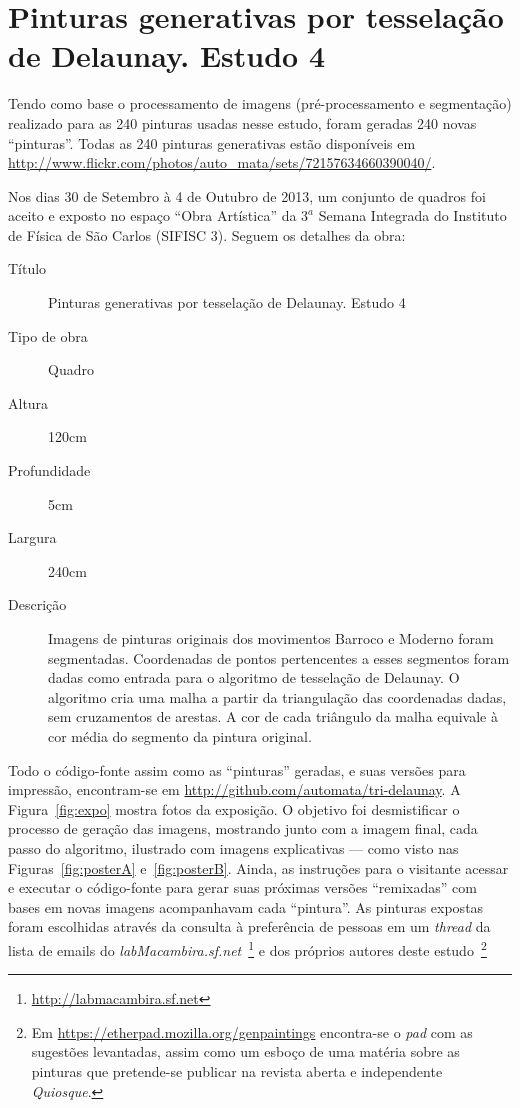 \chapter{Pinturas generativas por tesselação de Delaunay. Estudo 4}

Tendo como base o processamento de imagens (pré-processamento e segmentação)
realizado para as 240 pinturas usadas nesse estudo, foram geradas 240 novas
``pinturas''. Todas as 240 pinturas generativas estão disponíveis em
\url{http://www.flickr.com/photos/auto_mata/sets/72157634660390040/}.

Nos dias 30 de Setembro à 4 de Outubro de 2013, um conjunto de quadros foi
aceito e exposto no espaço ``Obra Artística'' da $3^a$ Semana Integrada do
Instituto de Física de São Carlos (SIFISC 3). Seguem os detalhes da obra:

\begin{description}
  \item[Título] Pinturas generativas por tesselação de Delaunay. Estudo 4
  \item[Tipo de obra] Quadro
  \item[Altura] 120cm
  \item[Profundidade] 5cm
  \item[Largura] 240cm
  \item[Descrição] Imagens de pinturas originais dos movimentos Barroco e Moderno foram
    segmentadas. Coordenadas de pontos pertencentes a esses segmentos foram dadas
    como entrada para o algoritmo de tesselação de Delaunay. O algoritmo cria uma
    malha a partir da triangulação das coordenadas dadas, sem cruzamentos de
    arestas. A cor de cada triângulo da malha equivale à cor média do segmento da
    pintura original.
\end{description}

Todo o código-fonte assim como as ``pinturas'' geradas, e suas versões para
impressão, encontram-se em \url{http://github.com/automata/tri-delaunay}. A
Figura~\ref{fig:expo} mostra fotos da exposição. O objetivo foi desmistificar o
processo de geração das imagens, mostrando junto com a imagem final, cada passo
do algoritmo, ilustrado com imagens explicativas --- como visto nas
Figuras~\ref{fig:posterA} e~\ref{fig:posterB}. Ainda, as instruções para o
visitante acessar e executar o código-fonte para gerar suas próximas versões
``remixadas'' com bases em novas imagens acompanhavam cada ``pintura''. As
pinturas expostas foram escolhidas através da consulta à preferência de pessoas
em um \textit{thread} da lista de emails do
\emph{labMacambira.sf.net}~\footnote{\url{http://labmacambira.sf.net}} e dos
próprios autores deste estudo~\footnote{Em
  \url{https://etherpad.mozilla.org/genpaintings} encontra-se o \textit{pad} com
  as sugestões levantadas, assim como um esboço de uma matéria sobre as pinturas
  que pretende-se publicar na revista aberta e independente \textit{Quiosque}.}

